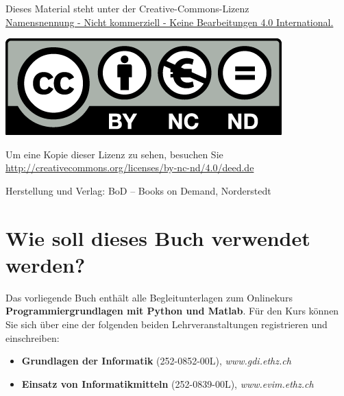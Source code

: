 \documentclass[10pt,paper=17cm:22cm, twoside=true, DIV=14]{scrbook}
\providecommand{\tightlist}{%
  \setlength{\itemsep}{0pt}\setlength{\parskip}{0pt}}
\begin{document}
\begin{titlepage}
\begin{center}
\begin{center}
\end{center}

\begin{center}
   Dieses Material steht unter der Creative-Commons-Lizenz\\
   \href{http://creativecommons.org/licenses/by-nc-nd/4.0/deed.de}{Namensnennung - Nicht kommerziell - Keine Bearbeitungen 4.0 International.} \\
    \end{center}
    \begin{center}
        \href{http://creativecommons.org/licenses/by-nc-nd/4.0/deed.de}{\includegraphics[scale=0.25]{figures/by-nc-nd_eu.png}}
    \end{center}
	\begin{center}
       Um eine Kopie dieser Lizenz zu sehen, besuchen Sie\\
       \href{http://creativecommons.org/licenses/by-nc-nd/4.0/deed.de}{http://creativecommons.org/licenses/by-nc-nd/4.0/deed.de}\\
	\end{center}
	Herstellung und Verlag: BoD – Books on Demand, Norderstedt
\end{center}
\end{titlepage}
\cleardoublepage

\setcounter{tocdepth}{2}
\tableofcontents

\mainmatter

\chapter{Wie soll dieses Buch verwendet werden?}

Das vorliegende Buch enthält alle Begleitunterlagen zum Onlinekurs
\textbf{Programmiergrundlagen mit Python und Matlab}. Für den Kurs
können Sie sich über eine der folgenden beiden Lehrveranstaltungen
registrieren und einschreiben:

\begin{itemize}
\tightlist
\item
  \textbf{Grundlagen der Informatik} (252-0852-00L),
  \emph{www.gdi.ethz.ch}
\item
  \textbf{Einsatz von Informatikmitteln} (252-0839-00L),
  \emph{www.evim.ethz.ch}
\end{itemize}
\end{document}
